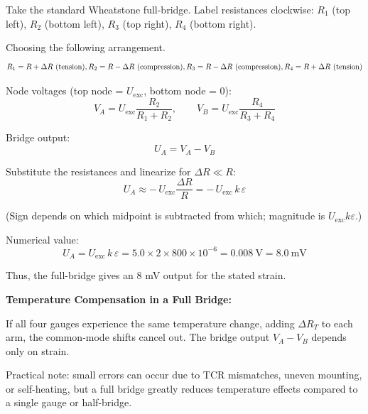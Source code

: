 \begin{solutionblock}
Take the standard Wheatstone full-bridge. Label resistances clockwise: 
$R_1$ (top left), $R_2$ (bottom left), $R_3$ (top right), $R_4$ (bottom right).

Choosing the following arrangement.
\[
R_1 = R + \Delta R \ (\text{tension}), \quad\\
R_2 = R - \Delta R \ (\text{compression}), \quad\\
R_3 = R - \Delta R \ (\text{compression}), \quad\\
R_4 = R + \Delta R \ (\text{tension})
\]

Node voltages (top node = $U_\text{exc}$, bottom node = 0):
\[
V_A = U_\text{exc} \frac{R_2}{R_1 + R_2}, \qquad
V_B = U_\text{exc} \frac{R_4}{R_3 + R_4}
\]

Bridge output:
\[
U_A = V_A - V_B
\]

Substitute the resistances and linearize for $\Delta R \ll R$:
\[
U_A \approx -\,U_\text{exc} \frac{\Delta R}{R} = -\,U_\text{exc}\, k\, \varepsilon
\]

(Sign depends on which midpoint is subtracted from which; magnitude is $U_\text{exc} k \varepsilon$.)

Numerical value:
\[
U_A = U_\text{exc}\, k\, \varepsilon = 5.0 \times 2 \times 800 \times 10^{-6} = 0.008~\text{V} = 8.0~\text{mV}
\]

Thus, the full-bridge gives an 8 mV output for the stated strain.

\end{solutionblock}

\begin{solutionblock}
\textbf{Temperature Compensation in a Full Bridge:}  

If all four gauges experience the same temperature change, adding $\Delta R_T$ to each arm, the common-mode shifts cancel out. The bridge output $V_A - V_B$ depends only on strain.  

Practical note: small errors can occur due to TCR mismatches, uneven mounting, or self-heating, but a full bridge greatly reduces temperature effects compared to a single gauge or half-bridge.
\end{solutionblock}




